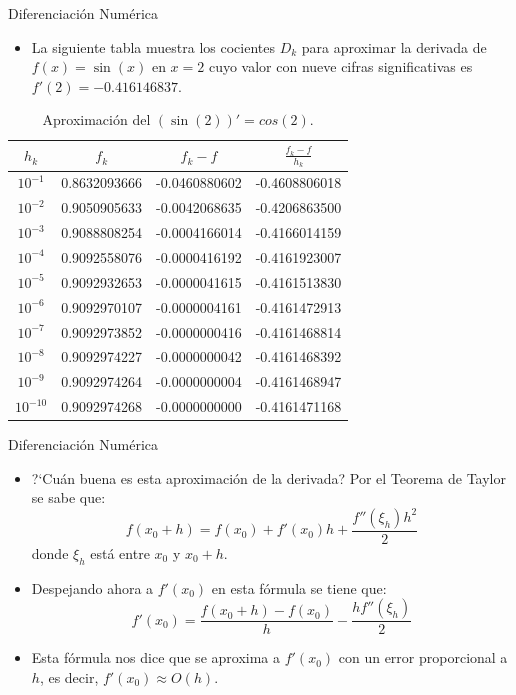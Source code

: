 \documentclass[12pt]{beamer}
\begin{document}
\begin{frame}{Diferenciaci\'on Num\'erica}
  \begin{itemize}
    \item La siguiente tabla muestra los cocientes $D_k$ para aproximar la derivada de $f(x) = \sin(x)$ en $x = 2$ cuyo valor con nueve cifras significativas es $f'(2) = -0.416146837$.
  \end{itemize}
  \begin{table}[!ht]
    \small
    \begin{center}
      \begin{tabular}{|c||c||c||c|}\hline
      $h_k$  & $f_k$ & $f_k-f$ & $\frac{f_k-f}{h_k}$ \\\hline\hline
    $10^{-1}$ & 0.8632093666 & -0.0460880602 & -0.4608806018\\
    $10^{-2}$ & 0.9050905633 & -0.0042068635 & -0.4206863500\\
    $10^{-3}$ & 0.9088808254 & -0.0004166014 & -0.4166014159\\
    $10^{-4}$ & 0.9092558076 & -0.0000416192 & -0.4161923007\\
    $10^{-5}$ & 0.9092932653 & -0.0000041615 & -0.4161513830\\
    $10^{-6}$ & 0.9092970107 & -0.0000004161 & -0.4161472913\\
    $10^{-7}$ & 0.9092973852 & -0.0000000416 & -0.4161468814\\
    $10^{-8}$ & 0.9092974227 & -0.0000000042 & -0.4161468392\\
    $10^{-9}$ & 0.9092974264 & -0.0000000004 & -0.4161468947\\
    $10^{-10}$& 0.9092974268 & -0.0000000000 & -0.4161471168\\\hline
    \end{tabular}
     \caption{Aproximaci\'on del $(\sin(2))'=cos(2)$.}
     \end{center}     
    \end{table}    
\end{frame}
\begin{frame}{Diferenciaci\'on Num\'erica}
  \begin{itemize}
    \item ?`Cu\'an buena es esta aproximaci\'on de la derivada? Por el Teorema de Taylor se sabe que:
    $$
    f(x_0+h) = f(x_0) + f'(x_0)h + \frac{f''(\xi_h)h^2}{2} 
    $$         
    donde $\xi_h$ est\'a entre $x_0$ y $x_0+h$.
    \item Despejando ahora a $f'(x_0)$ en esta f\'ormula se tiene que:
    $$
    f'(x_0) = \frac{f(x_0+h)-f(x_0)}{h} - \frac{hf''(\xi_h)}{2}
    $$
    \item Esta f\'ormula nos dice que se aproxima a $f'(x_0)$ con un error proporcional a $h$, es decir, $f'(x_0) \approx O(h)$.    
  \end{itemize}
\end{frame}
\end{document}
